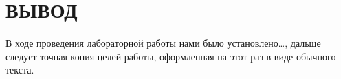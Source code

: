 \section{ВЫВОД}

В ходе проведения лабораторной работы нами было установлено\dots,
дальше следует точная копия целей работы, оформленная на этот раз в 
виде обычного текста.

\newpage


